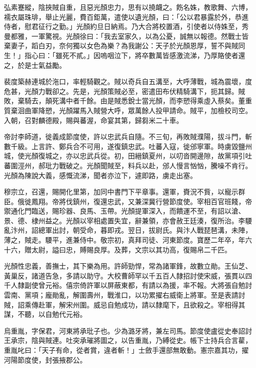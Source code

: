 \begin{pinyinscope}
 弘素蹇縱，陰挾賊自重，且惡光顏忠力，思有以撓衊之。飭名姝，教歌舞、六博，襦衣屬珠琲，舉止光麗，費百鉅萬，遣使以遺光顏，曰：「公以君暴露於外，恭進侍者，慰君征行之勤。」光顏約旦日納焉。乃大合將校置酒，引使者以侍姝至，秀曼都雅，一軍驚視。光顏徐曰：「我去室家久，以為公憂，誠無以報德。然戰士皆棄妻子，蹈白刃，奈何獨以女色為樂？為我謝公：天子於光顏恩厚，誓不與賊同生！」指心曰：「雖死不貳。」因嗚咽泣下，將卒數萬皆感激流涕，乃厚賂使者還之，於是士氣益勵。



 裴度築赫連城於沲口，率輕騎觀之。賊以奇兵自五溝至，大呼薄戰，城為震壞，度危甚，光顏力戰卻之。先是，光顏策賊必至，密遣田布伏精騎溝下，扼其歸。賊敗，棄騎去，顛死溝中者千餘。由是賊悉銳士當光顏，而李愬得乘虛入蔡矣。董重質棄洄曲軍降愬，光顏躍馬入賊營大呼，眾萬餘人投甲請命。賊平，加檢校司空。入朝，召對麟德殿，賜與蕃渥，命宴其第，歸芻米二十車。



 帝討李師道，徙義成節度使，許以忠武兵自隨。不三旬，再敗賊濮陽，拔斗門，斬數千級。上言許、鄭兵合不可用，遂復鎮忠武。吐蕃入寇，徙邠寧軍。時虜毀鹽州城，使光顏復城之，亦以忠武兵從。初，田縉鎮夏州，以叨沓開邊隙，故黨項引吐蕃圍涇州，郝玭力戰破之。光顏聞賊至，料兵以赴，邠人慢言忷忷，騰噪不肯行。光顏為陳說大義，感慨流涕，聞者亦泣下，遽即路，虜走出塞。



 穆宗立，召還，賜開化里第，加同中書門下平章事。還軍，賚況不貲，以寵示群臣。俄徙鳳翔。帝將伐鎮州，復還忠武，又兼深冀行營節度使。宰相百官班餞，帝禦通化門臨送，賜珍器、良馬、玉帶。光顏提軍深入，而饋運不至，有詔以滄、景、德、棣州益之。光顏以宰相處置失宜，辭兼領，亦會赦王廷湊，復所治。李騕亂汴州，詔總軍出討，朝受命，暮即戎。翌日，拔尉氏。與汴人戰琵琶溝，未陣，薄之，賊走。騕平，進兼侍中。敬宗初，真拜司徒、河東節度。寶歷二年卒，年六十六，贈太尉，謚曰忠，賻賜良厚。及葬，文宗以其功高，復賜帛二千匹。



 光顏性忠義，善撫士，其下樂為用。許師勁悍，常為諸軍鋒，故數立勛。王仙芝、黃巢反，諸道告急，多請以助守。大校曹師罕以千五百人隸招討使宋威，張貫以四千人隸副使曾元裕。僖宗倚許軍以屏蔽東都，有請以為援，率不報。大將張自勉討雲南、黨項；龐勛亂，解圍壽州，戰淮口，以功累擢右威衛上將軍。至是表請討賊，詔乘傳赴軍，解宋州圍。威忌自勉成功，請以隸麾下，且欲殺之。宰相得其謀，不聽，以自勉代元裕。



 烏重胤，字保君，河東將承玭子也。少為潞牙將，兼左司馬。節度使盧從史奉詔討王承宗，陰與賊連。吐突承璀將圖之，以告重胤，乃縛從史。帳下士持兵合言雚，重胤叱曰：「天子有命，從者賞，違者斬！」士斂手還部無敢動。憲宗嘉其功，擢河陽節度使，封張掖郡公。




\end{pinyinscope}

